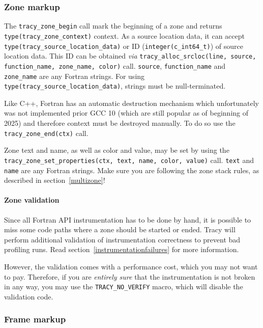 \documentclass[hidelinks,titlepage,a4paper,twoside]{article}
\begin{document}
\subsubsection{Zone markup}

The \texttt{tracy\_zone\_begin} call mark the beginning of a zone and returns \texttt{type(tracy\_zone\_context)} context.
As a source location data, it can accept \texttt{type(tracy\_source\_location\_data)} or ID (\texttt{integer(c\_int64\_t)}) of source location data.
This ID can be obtained \textit{via} \texttt{tracy\_alloc\_srcloc(line, source, function\_name, zone\_name, color)} call.
\texttt{source}, \texttt{function\_name} and \texttt{zone\_name} are any Fortran strings.
For using \texttt{type(tracy\_source\_location\_data)}, strings must be null-terminated.

Like C++, Fortran has an automatic destruction mechanism which unfortunately was not implemented prior GCC 10 (which are still popular as of beginning of 2025) and therefore context must be destroyed manually.
To do so use the \texttt{tracy\_zone\_end(ctx)} call.

Zone text and name, as well as color and value, may be set by using the \texttt{tracy\_zone\_set\_properties(ctx, text, name, color, value)} call.
\texttt{text} and \texttt{name} are any Fortran strings.
Make sure you are following the zone stack rules, as described in section~\ref{multizone}!

\paragraph{Zone validation}

Since all Fortran API instrumentation has to be done by hand, it is possible to miss some code paths where a zone should be started or ended. Tracy will perform additional validation of instrumentation correctness to prevent bad profiling runs. Read section~\ref{instrumentationfailures} for more information.

However, the validation comes with a performance cost, which you may not want to pay. Therefore, if you are \emph{entirely sure} that the instrumentation is not broken in any way, you may use the \texttt{TRACY\_NO\_VERIFY} macro, which will disable the validation code.

\subsubsection{Frame markup}
\end{document}
